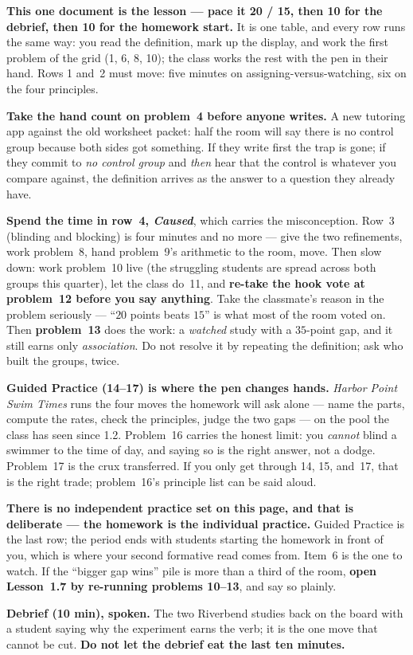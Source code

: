 \documentclass[10pt]{article}
\begin{document}
\begin{teachernote}
\textbf{This one document is the lesson --- pace it 20 / 15, then 10 for the debrief, then 10
for the homework start.} It is one table, and every row runs the same way: you read the
definition, mark up the display, and work the first problem of the grid (1, 6, 8, 10); the
class works the rest with the pen in their hand. Rows 1 and~2 must move: five minutes on
assigning-versus-watching, six on the four principles.

\textbf{Take the hand count on problem~4 before anyone writes.} A new tutoring app against the
old worksheet packet: half the room will say there is no control group because both sides got
something. If they write first the trap is gone; if they commit to \emph{no control group} and
\emph{then} hear that the control is whatever you compare against, the definition arrives as
the answer to a question they already have.

\textbf{Spend the time in row~4, \emph{Caused}}, which carries the misconception. Row~3
(blinding and blocking) is four minutes and no more --- give the two refinements, work
problem~8, hand problem~9's arithmetic to the room, move. Then slow down: work problem~10 live
(the struggling students are spread across both groups this quarter), let the class do~11, and
\textbf{re-take the hook vote at problem~12 before you say anything}. Take the classmate's
reason in the problem seriously --- ``$20$ points beats $15$'' is what most of the room voted
on. Then \textbf{problem~13} does the work: a \emph{watched} study with a $35$-point gap, and
it still earns only \emph{association}. Do not resolve it by repeating the definition; ask who
built the groups, twice.

\textbf{Guided Practice (14--17) is where the pen changes hands.} \emph{Harbor Point Swim
Times} runs the four moves the homework will ask alone --- name the parts, compute the rates,
check the principles, judge the two gaps --- on the pool the class has seen since 1.2.
Problem~16 carries the honest limit: you \emph{cannot} blind a swimmer to the time of day, and
saying so is the right answer, not a dodge. Problem~17 is the crux transferred. If you only
get through 14, 15, and~17, that is the right trade; problem~16's principle list can be said
aloud.

\textbf{There is no independent practice set on this page, and that is deliberate --- the
homework is the individual practice.} Guided Practice is the last row; the period ends with
students starting the homework in front of you, which is where your second formative read
comes from. Item~6 is the one to watch. If the ``bigger gap wins'' pile is more than a third of
the room, \textbf{open Lesson~1.7 by re-running problems 10--13}, and say so plainly.

\textbf{Debrief (10 min), spoken.} The two Riverbend studies back on the board with a student
saying why the experiment earns the verb; it is the one move that cannot be cut. \textbf{Do not
let the debrief eat the last ten minutes.}
\end{teachernote}
\end{document}
